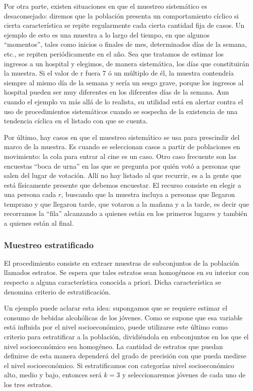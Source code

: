 \documentclass[]{article}
\begin{document}
Por otra parte, existen situaciones en que el muestreo sistemático es
desaconsejado: diremos que la población presenta un comportamiento
cíclico si cierta característica se repite regularmente cada cierta
cantidad fija de casos. Un ejemplo de esto es una muestra a lo largo del
tiempo, en que algunos ``momentos'', tales como inicios o finales de mes,
determinados días de la semana, etc., se repiten periódicamente en el
año. Sea que tratamos de estimar los ingresos a un hospital y elegimos, de manera sistemática, los días que constituirán la muestra. Si el valor de r fuera 7 ó un múltiplo de él, la muestra contendría siempre al mismo día de la semana y sería un sesgo grave, porque los ingresos al hospital pueden ser muy diferentes en los diferentes días de la semana. Aun cuando el ejemplo va más allá de lo realista, su utilidad está en alertar contra el uso de procedimientos sistemáticos cuando se sospecha de la existencia de una tendencia cíclica en el listado con que se cuenta.

Por último, hay casos en que el muestreo sistemático se usa para
prescindir del marco de la muestra. Es cuando se seleccionan casos a
partir de poblaciones en movimiento: la cola para entrar al cine es un
caso. Otro caso frecuente son las encuestas ``boca de urna'' en las que se
pregunta por quién votó a personas que salen del lugar de votación. Allí
no hay listado al que recurrir, es a la gente que está físicamente
presente que debemos encuestar. El recurso consiste en elegir a una
persona cada \(r\), buscando que la muestra incluya a personas que llegaron temprano y que llegaron tarde, que votaron a la mañana y a la tarde, es decir que recorramos la ``fila'' alcanzando a quienes están en los primeros lugares y también a quienes están al final.

\hypertarget{muestreo-estratificado}{%
\subsubsection{Muestreo estratificado}\label{muestreo-estratificado}}

El procedimiento consiste en extraer muestras de subconjuntos de la
población llamados estratos. Se espera que tales estratos sean
homogéneos en su interior con respecto a alguna característica conocida
a priori. Dicha característica se denomina criterio de estratificación.

Un ejemplo puede aclarar esta idea: supongamos que se requiere estimar
el consumo de bebidas alcohólicas de los jóvenes. Como se supone que esa
variable está influida por el nivel socioeconómico, puede utilizarse
este último como criterio para estratificar a la población, dividiéndola
en subconjuntos en los que el nivel socioeconómico sea homogéneo. La
cantidad de estratos que puedan definirse de esta manera dependerá del
grado de precisión con que pueda medirse el nivel socioeconómico. Si
estratificamos con categorías nivel socioeconómico alto, medio y bajo,
entonces será \(k=3\) y seleccionaremos jóvenes de cada uno de los tres
estratos.
\end{document}
